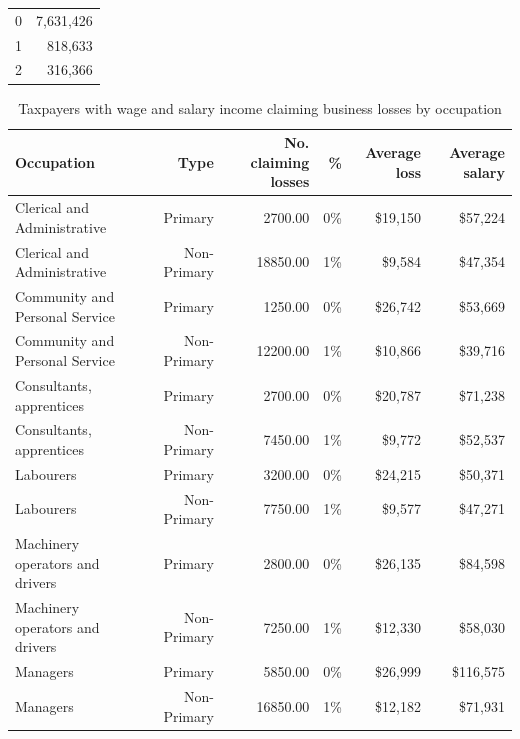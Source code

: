 \documentclass{grattan}\usepackage[]{graphicx}\usepackage[]{color}
\begin{document}
\begin{table}
\begin{tabular}{rr}
  \toprule
  \midrule
0 & 7,631,426 \\ 
  1 & 818,633 \\ 
  2 & 316,366 \\ 
   \bottomrule
\end{tabular}

\end{table}

\begin{table}
\caption{Taxpayers with wage and salary income claiming business losses by occupation}\label{tbl:bizlosses}
\begin{tabular}{lrrrrr}
  \toprule
{\textbf{Occupation}} & {\textbf{Type}} & {\textbf{No. claiming losses}} & {\textbf{\%}} & {\textbf{Average loss}} & {\textbf{Average salary}} \\ 
  \midrule
Clerical and Administrative & Primary & 2700.00 & 0\% & \$19,150 & \$57,224 \\ 
  Clerical and Administrative & Non-Primary & 18850.00 & 1\% & \$9,584 & \$47,354 \\ 
   [6pt]Community and Personal Service & Primary & 1250.00 & 0\% & \$26,742 & \$53,669 \\ 
  Community and Personal Service & Non-Primary & 12200.00 & 1\% & \$10,866 & \$39,716 \\ 
   [6pt]Consultants, apprentices & Primary & 2700.00 & 0\% & \$20,787 & \$71,238 \\ 
  Consultants, apprentices & Non-Primary & 7450.00 & 1\% & \$9,772 & \$52,537 \\ 
   [6pt]Labourers & Primary & 3200.00 & 0\% & \$24,215 & \$50,371 \\ 
  Labourers & Non-Primary & 7750.00 & 1\% & \$9,577 & \$47,271 \\ 
   [6pt]Machinery operators and drivers & Primary & 2800.00 & 0\% & \$26,135 & \$84,598 \\ 
  Machinery operators and drivers & Non-Primary & 7250.00 & 1\% & \$12,330 & \$58,030 \\ 
   [6pt]Managers & Primary & 5850.00 & 0\% & \$26,999 & \$116,575 \\ 
  Managers & Non-Primary & 16850.00 & 1\% & \$12,182 & \$71,931 \\ 

\end{tabular}
\end{table}
\end{document}
